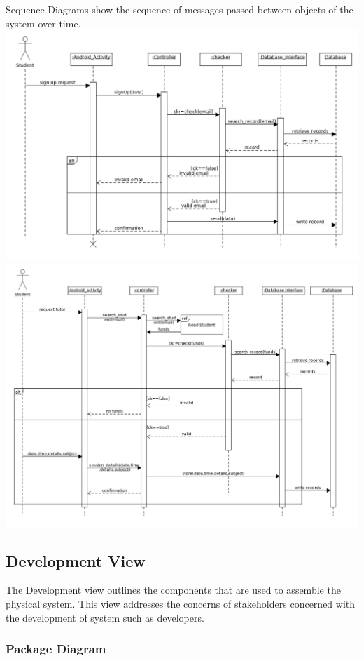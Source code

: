 \documentclass[12pt]{article}
\begin{document}
Sequence Diagrams show the sequence of messages passed between objects of the system over time.\\
\includegraphics[width=140mm]{./sequence_diagram/create_student.png}
\includegraphics[width=140mm]{./sequence_diagram/request_tutor.png}


\subsection{Development View}
The Development view outlines the components that are used to assemble the physical system.
This view addresses the concerns of stakeholders concerned with the development of system such as developers.\\
\subsubsection{Package Diagram}
\end{document}
